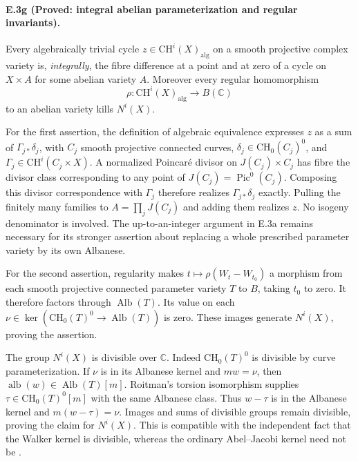 \paragraph{E.3g (Proved: integral abelian parameterization and regular invariants).}
Every algebraically trivial cycle $z\in\mathrm{CH}^i(X)_{\mathrm{alg}}$
on a smooth projective complex variety is, \emph{integrally}, the
fibre difference at a point and at zero of a cycle on $X\times A$
for some abelian variety $A$. Moreover every regular homomorphism
\[
 \rho:\mathrm{CH}^i(X)_{\mathrm{alg}}\longrightarrow B(\mathbb C)
\]
to an abelian variety kills $N^i(X)$.

For the first assertion, the definition of algebraic equivalence
expresses $z$ as a sum of $\Gamma_{j*}\delta_j$, with $C_j$ smooth
projective connected curves, $\delta_j\in\mathrm{CH}_0(C_j)^0$,
and $\Gamma_j\in\mathrm{CH}^i(C_j\times X)$. A normalized
Poincar\'e divisor on $J(C_j)\times C_j$ has fibre the divisor
class corresponding to any point of $J(C_j)=\operatorname{Pic}^0(C_j)$.
Composing this divisor correspondence with $\Gamma_j$ therefore
realizes $\Gamma_{j*}\delta_j$ exactly. Pulling the finitely many
families to $A=\prod_jJ(C_j)$ and adding them realizes $z$.
No isogeny denominator is involved. The up-to-an-integer argument
in E.3a remains necessary for its stronger assertion about
replacing a whole prescribed parameter variety by its own Albanese.

For the second assertion, regularity makes
$t\mapsto\rho(W_t-W_{t_0})$ a morphism from each smooth projective
connected parameter variety $T$ to $B$, taking $t_0$ to zero.
It therefore factors through $\operatorname{Alb}(T)$. Its value on
each $\nu\in\ker(\mathrm{CH}_0(T)^0\to\operatorname{Alb}(T))$
is zero. These images generate $N^i(X)$, proving the assertion.

The group $N^i(X)$ is divisible over $\mathbb C$. Indeed
$\mathrm{CH}_0(T)^0$ is divisible by curve parameterization. If
$\nu$ is in its Albanese kernel and $mw=\nu$, then
$\operatorname{alb}(w)\in\operatorname{Alb}(T)[m]$.
Roitman's torsion isomorphism
\citep[Theorem 4.2]{cyBloch1979} supplies
$\tau\in\mathrm{CH}_0(T)^0[m]$ with the same Albanese class.
Thus $w-\tau$ is in the Albanese kernel and $m(w-\tau)=\nu$.
Images and sums of divisible groups remain divisible, proving
the claim for $N^i(X)$. This is compatible with the independent
fact that the Walker kernel is divisible, whereas the ordinary
Abel--Jacobi kernel need not be
\citep[Theorem 2.3 and Remark 2.4, author p.~12]{cyACMVWalker2022}.

